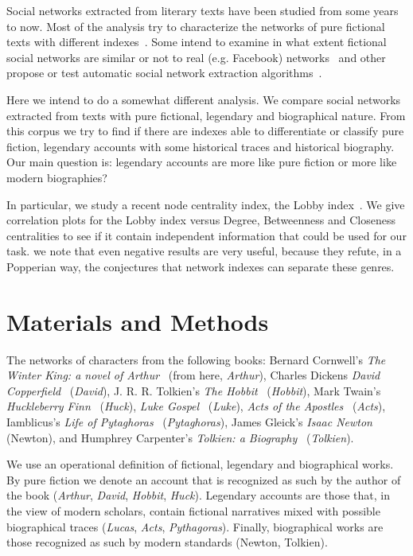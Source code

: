 \documentclass[review]{elsarticle}
\begin{document}
Social networks extracted from literary texts have been studied from some
years to now. Most of the analysis try to characterize the networks
of pure fictional texts with different indexes~\cite{choi2007,mac2012,agarwal2012,mac2013,kenna2016,ribeiro2016}.
Some intend to examine in what extent
fictional social networks are similar or not to real (e.g. Facebook)
networks~\cite{alberich2002,gleiser2007} 
and other propose or test automatic social network
extraction algorithms~\cite{elson2010,grayson2016}. 

Here we intend to do a somewhat different analysis. We compare 
social networks extracted from texts with pure fictional, 
legendary and biographical nature. 
From this corpus we try to find if there are indexes able to
differentiate or classify pure fiction, legendary accounts with some 
historical traces and historical biography. Our main question is:
legendary accounts are more like pure fiction or more like
modern biographies?

In particular, we study a recent node centrality index, the Lobby 
index~\cite{korn2009,campiteli2013,lu2016}. We give
correlation plots for the Lobby index versus Degree, Betweenness and 
Closeness centralities to see if it contain
independent information that could be used for our task.
we note that even negative results are very useful, because they
refute, in a Popperian way, the conjectures that network indexes
can separate these genres.

\section{Materials and Methods}
\label{Methods}

The networks of characters  from the following books:
Bernard Cornwell's \emph{The Winter King: a novel of
Arthur}~\cite{cornwell2007} (from here, \emph{Arthur}),
Charles Dickens \emph{David Copperfield}~\citep{sgb} (\emph{David}),
J. R. R. Tolkien's \emph{The Hobbit}~\cite{tolkien2012} (\emph{Hobbit}), 
Mark Twain's \emph{Huckleberry Finn}~\citep{sgb} (\emph{Huck}),
\emph{Luke Gospel}~\cite{holybible} (\emph{Luke}), 
\emph{Acts of the Apostles}~\cite{holybible} (\emph{Acts}), 
Iamblicus's \emph{Life of Pytaghoras}~\cite{taylor1986}
(\emph{Pytaghoras}), James Gleick's \emph{Isaac Newton}~\cite{gleick2003}
(Newton), and Humphrey Carpenter's \emph{Tolkien: a
Biography}~\cite{carpenter2014} (\emph{Tolkien}). 

We use an operational definition of fictional, 
legendary and biographical
works. By pure fiction we denote an account that is recognized as such
by the author of the book (\emph{Arthur}, \emph{David}, \emph{Hobbit}, \emph{Huck}). 
Legendary accounts are those that, in the view of modern scholars,
contain fictional narratives mixed 
with possible biographical traces (\emph{Lucas}, \emph{Acts}, \emph{Pythagoras}).
Finally, biographical works are those recognized as such by
modern standards (Newton, Tolkien). 
\end{document}
